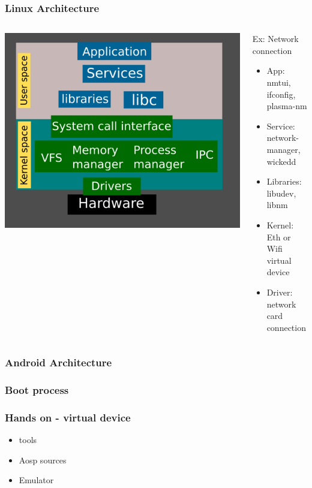 \documentclass{beamer}
\begin{document}
\begin{frame}
  \frametitle{Linux Architecture}
  \begin{columns}
    \includegraphics[width=\textwidth,height=\textheight,keepaspectratio]{./media/linux_arch.png}
    \begin{block}{Ex: Network connection}
      \begin{itemize}
      \item{App: nmtui, ifconfig, plasma-nm}
      \item{Service: network-manager, wickedd}
      \item{Libraries: libudev, libnm}
      \item{Kernel: Eth or Wifi virtual device}
      \item{Driver: network card connection}
      \end{itemize}
    \end{block}
  \end{columns}
\end{frame}

\begin{frame}
  \frametitle{Android Architecture}
\end{frame}

\begin{frame}
  \frametitle{Boot process}
\end{frame}

\begin{frame}
  \frametitle{Hands on - virtual device}
  \begin{itemize}
  \item{tools}
  \item{Aosp sources}
  \item{Emulator}
  \end{itemize}
\end{frame}
    
  
\end{document}
